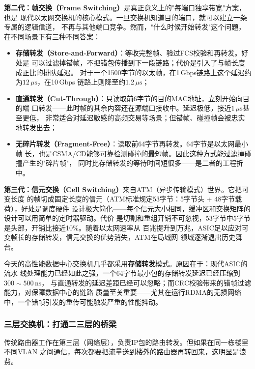 \textbf{第二代：帧交换（Frame Switching）}是真正意义上的"每端口独享带宽"方案，也是
现代以太网交换机的核心模式。一旦交换机知道目的端口，就可以建立一条专属的逻辑信道，
不再与其他端口竞争。然而，"什么时候开始转发"这个问题，在不同场景下有三种不同答案：

\begin{itemize}
  \item \textbf{存储转发（Store-and-Forward）}：等收完整帧、验过FCS校验和再转发。好处是
    可以过滤掉错帧，不把错包传播到下一段链路；代价是引入了与帧长度成正比的排队延迟。
    对于一个1500字节的以太帧，在1\,Gbps链路上这个延迟约为$12\,\mu\text{s}$，在10\,Gbps
    链路上则降至约$1.2\,\mu\text{s}$；
  \item \textbf{直通转发（Cut-Through）}：只读取前6字节的目的MAC地址，立刻开始向目的端
    口转发——此时帧的其余内容还在源端口接收中。延迟极低，接近$1\,\mu\text{s}$甚至更低，
    非常适合对延迟敏感的高频交易等场景；但错帧、碰撞帧会被忠实地转发出去；
  \item \textbf{无碎片转发（Fragment-Free）}：读取前64字节再转发。64字节是以太网最小帧
    长，也是CSMA/CD能够可靠检测碰撞的最短帧。因此这种方式能过滤掉碰撞产生的"碎片帧"，
    同时比存储转发的等待时间短很多——是二者的工程折中。
\end{itemize}

\textbf{第三代：信元交换（Cell Switching）}来自ATM（异步传输模式）世界。它把可变长度
的帧切成固定长度的信元（ATM标准规定53字节：5字节头 + 48字节载荷），好处是调度硬件
设计极大简化——每个信元大小相同，缓冲区和交换矩阵的设计可以用简单的定时器驱动。代价
是切割和重组开销不可忽视，53字节中5字节是头部，开销比接近10\%。随着以太网速率从
百兆提升到万兆，ASIC足以应对可变帧长的存储转发，信元交换的优势消失，ATM在局域网
领域逐渐退出历史舞台。

今天的高性能数据中心交换机几乎都采用\textbf{存储转发}模式。原因在于：现代ASIC的流水
线处理能力已经如此之强，一个64字节最小包的存储转发延迟已经压缩到$300\sim500\,\text{ns}$，
与直通转发的延迟差距已经可以忽略；而CRC校验带来的错帧过滤能力，对保障数据中心的链路
质量至关重要——尤其在运行RDMA的无损网络中，一个错帧引发的重传可能触发严重的性能抖动。

\subsubsection{三层交换机：打通二三层的桥梁}

传统路由器工作在第三层（网络层），负责IP包的路由转发。但如果在同一栋楼里不同VLAN
之间通信，每次都要把流量送到楼外的路由器再转回来，这明显是浪费。

